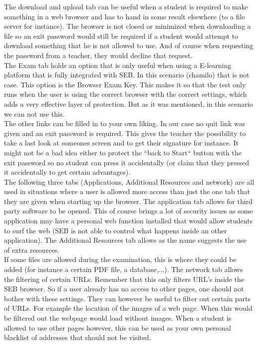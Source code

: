 The download and upload tab can be useful when a student is required to make something in a web browser and has to hand in some result elsewhere (to a file server for instance). The browser is not closed or minimized when downloading a file so an exit password would still be required if a student would attempt to download something that he is not allowed to use. And of course when requesting the password from a teacher, they would decline that request.\\

The Exam tab holds an option that is only useful when using a E-learning platform that is fully integrated with SEB. In this scenario (chamilo) that is not case. This option is the Browser Exam Key. This makes it so that the test only runs when the user is using the correct browser with the correct settings,  which adds a very effective layer of protection. But as it was mentioned, in this scenario we can not use this.\\

 The other links can be filled in to your own liking. In our case no quit link was given and an exit password is required. This gives the teacher the possibility to take a last look at someones screen and to get their signature for instance. It might not be a bad idea either to protect the ``back to Start`` button with the exit password so no student can press it accidentally (or claim that they pressed it accidentally to get certain advantages).\\

The following three tabs (Applications, Additional Resources and network) are all used in situations where a user is allowed more access than just the one tab that they are given when starting up the browser. The application tab allows for third party software to be opened. This of course brings a lot of security issues as some application may have a personal web function installed that would allow students to surf the web (SEB is not able to control what happens inside an other application). The Additional Resources tab allows as the name suggests the use of extra resources.\\

 If some files are allowed during the examination, this is where they could be added (for instance a certain PDF file, a database,...). The network tab allows the filtering of certain URLs. Remember that this only filters URL's inside the SEB browser. So if a user already has no access to other pages, one should not bother with these settings. They can however be useful to filter out certain parts of URLs. For example the location of the images of a web page. When this would be filtered out the webpage would load without images.
When a student is allowed to use other pages however, this can be used as your own personal blacklist of addresses that should not be visited.\\

